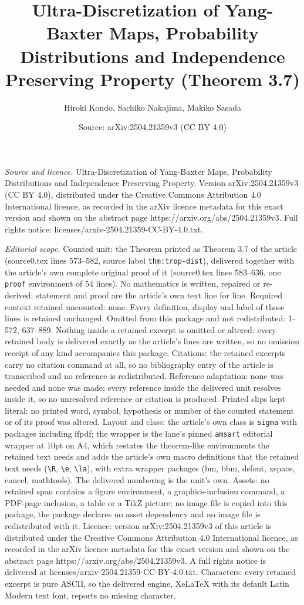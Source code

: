 \documentclass[10pt,a4paper]{amsart}
\title[Ultra-Discretization of Yang-Baxter Maps, Probability Distri]{Ultra-Discretization of Yang-Baxter Maps, Probability Distributions and Independence Preserving Property (Theorem 3.7)}
\author{Hiroki Kondo, Sachiko Nakajima, Makiko Sasada}
\date{Source: arXiv:2504.21359v3 (CC BY 4.0)}
\begin{document}
\maketitle

\noindent\emph{Source and licence.} Ultra-Discretization of Yang-Baxter Maps, Probability Distributions and Independence Preserving Property. Version arXiv:2504.21359v3 (CC BY 4.0), distributed under the Creative Commons Attribution 4.0 International licence, as recorded in the arXiv licence metadata for this exact version and shown on the abstract page https://arxiv.org/abs/2504.21359v3. Full rights notice: licenses/arxiv-2504.21359-CC-BY-4.0.txt.\par\smallskip

\noindent\textit{Editorial scope.} Counted unit: the Theorem printed as Theorem 3.7 of the article (source0.tex lines 573--582, source label \texttt{thm:trop-dist}), delivered together with the article's own complete original proof of it (source0.tex lines 583--636, one \texttt{proof} environment of 54 lines). No mathematics is written, repaired or re-derived: statement and proof are the article's own text line for line. Required context retained uncounted: none. Every definition, display and label of those lines is retained unchanged. Omitted from this package and not redistributed: 1--572, 637--889. Nothing inside a retained excerpt is omitted or altered: every retained body is delivered exactly as the article's lines are written, so no omission receipt of any kind accompanies this package. Citations: the retained excerpts carry no citation command at all, so no bibliography entry of the article is transcribed and no reference is redistributed. Reference adaptation: none was needed and none was made; every reference inside the delivered unit resolves inside it, so no unresolved reference or citation is produced. Printed slips kept literal: no printed word, symbol, hypothesis or number of the counted statement or of its proof was altered. Layout and class: the article's own class is \texttt{sigma} with packages including ifpdf; the wrapper is the lane's pinned \texttt{amsart} editorial wrapper at 10pt on A4, which restates the theorem-like environments the retained text needs and adds the article's own macro definitions that the retained text needs (\texttt{\textbackslash R}, \texttt{\textbackslash e}, \texttt{\textbackslash la}), with extra wrapper packages (bm, bbm, dsfont, xspace, cancel, mathtools). The delivered numbering is the unit's own. Assets: no retained span contains a figure environment, a graphics-inclusion command, a PDF-page inclusion, a table or a TikZ picture; no image file is copied into this package, the package declares no asset dependency and no image file is redistributed with it. Licence: version arXiv:2504.21359v3 of this article is distributed under the Creative Commons Attribution 4.0 International licence, as recorded in the arXiv licence metadata for this exact version and shown on the abstract page https://arxiv.org/abs/2504.21359v3. A full rights notice is delivered at licenses/arxiv-2504.21359-CC-BY-4.0.txt. Characters: every retained excerpt is pure ASCII, so the delivered engine, XeLaTeX with its default Latin Modern text font, reports no missing character.
\end{document}
